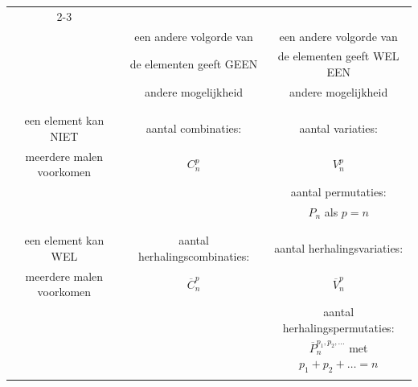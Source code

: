 
\begin{center}
\begin{tabular}{|c|c|c|}
\cline{2-3}
\multicolumn{1}{c|}{} & &\\
\multicolumn{1}{c|}{} & een andere volgorde van & een andere volgorde van\\
\multicolumn{1}{c|}{} & de elementen geeft GEEN & de elementen geeft WEL EEN\\
\multicolumn{1}{c|}{} & andere mogelijkheid & andere mogelijkheid\\
\multicolumn{1}{c|}{} & &\\
\hline
&&\\
een element kan NIET & aantal combinaties: & aantal variaties: \\
meerdere malen voorkomen & $C_n^p$ & $V_n^p$ \\
 & &  aantal permutaties:\\
 & & $P_n$ als $p=n$\\
&&\\
\hline
&&\\
een element kan WEL & aantal herhalingscombinaties: & aantal herhalingsvariaties: \\
meerdere malen voorkomen & $\overline{C}_n^p$ & $\overline{V}_n^p$ \\
 & & aantal herhalingspermutaties:   \\
 & & $\overline{P}_n^{p_1,p_2, \dots}$ met $p_1+p_2+\dots=n$  \\
&&\\
\hline
\end{tabular}
\end{center}

\vspace{1cm}

